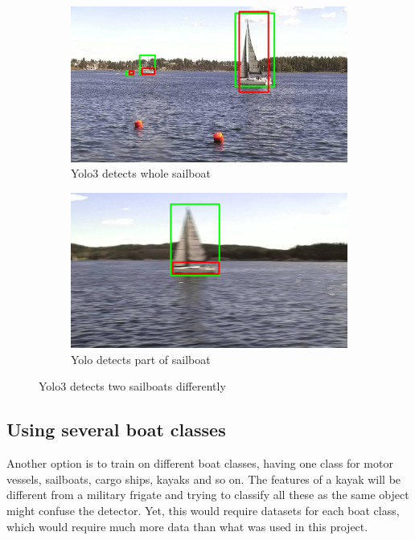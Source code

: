 \begin{figure}[h!]
\begin{subfigure}{.5\textwidth}
  \centering
  \includegraphics[width=0.8\linewidth]{discussion/sailboat/selected_06_25_frame0349.jpg}
  \caption{Yolo3 detects whole sailboat}
  \label{fig:yolo3_sailboat_whol}
\end{subfigure}%
\begin{subfigure}{.5\textwidth}
  \centering
  \includegraphics[width=.8\linewidth]{discussion/sailboat/selected_06_25_frame0340.jpg}
  \caption{Yolo detects part of sailboat}
  \label{fig:yolo3_sailboat_part}
\end{subfigure}
\caption{Yolo3 detects two sailboats differently}
\label{fig:yolo3_sailboat}
\end{figure}


\subsection{Using several boat classes}
Another option is to train on different boat classes, having one class for motor vessels, sailboats, cargo ships, kayaks and so on. The features of a kayak will be different from a military frigate and trying to classify all these as the same object might confuse the detector. Yet, this would require datasets for each boat class, which would require much more data than what was used in this project.

